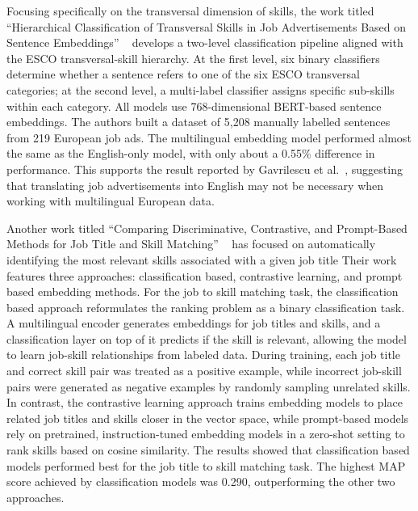 \documentclass[]{ceurart}
\begin{document}
Focusing specifically on the transversal dimension of skills, the work titled
``Hierarchical Classification of Transversal Skills in Job Advertisements Based on
Sentence Embeddings'' ~\cite{Leon2024Hierarchical} develops a two-level
classification pipeline aligned with the ESCO transversal-skill hierarchy. At the
first level, six binary classifiers determine whether a sentence refers to one of the
six ESCO transversal categories; at the second level, a multi-label classifier assigns
specific sub-skills within each category. All models use 768-dimensional BERT-based
sentence embeddings. The authors built a dataset of 5,208 manually labelled sentences
from 219 European job ads. The multilingual embedding model performed almost the same 
as the English-only model, with only about a 0.55\% difference in performance. This 
supports the result reported by Gavrilescu et al.~\cite{Gavrilescu2025}, suggesting 
that translating job advertisements into English may not be necessary when working with 
multilingual European data.

Another work titled “Comparing Discriminative, Contrastive, and Prompt-Based Methods for 
Job Title and Skill Matching” ~\cite{zhang2025nlpnorth} has focused on automatically identifying the most relevant 
skills associated with a given job title Their work features three approaches: classification based, contrastive learning, 
and prompt based embedding methods.  For the job to skill matching task, the classification based 
approach reformulates the ranking problem as a binary classification task. A multilingual 
encoder generates embeddings for job titles and skills, and a classification layer on top of 
it predicts if the skill is relevant, allowing the model to learn job-skill relationships from 
labeled data. During training, each job title and correct skill pair was treated as a positive 
example, while incorrect job-skill pairs were generated as negative 
examples by randomly sampling unrelated skills. In contrast, the contrastive learning approach 
trains embedding models to place related job titles and skills closer in the vector space, while 
prompt-based models rely on pretrained, instruction-tuned embedding models in a zero-shot setting 
to rank skills based on cosine similarity. The results showed that classification based models 
performed best for the job title to skill matching task. The highest MAP score achieved by 
classification models was 0.290, outperforming the other two approaches. 
\end{document}
